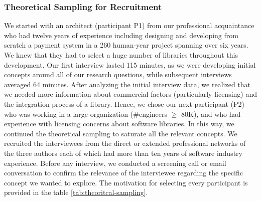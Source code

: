 \subsubsection{Theoretical Sampling for Recruitment}

We started with an architect (participant P1) from our professional acquaintance who had twelve years of experience including designing and developing from scratch a payment system in a 260 human-year project spanning over six years. We knew that they had to select a huge number of libraries throughout this development. Our first interview lasted  115 minutes, as we were developing initial concepts around all of our research questions, while subsequent interviews averaged 64 minutes. %
After analyzing the initial interview data, we realized that we needed more information about commercial factors (particularly licensing) and the integration process of a library. Hence, we chose our next participant (P2) who was working in a large organization (\#engineers $\geq$ 80K), and who had experience with licensing concerns about software libraries. In this way, we continued the theoretical sampling to saturate all the relevant concepts. We recruited the interviewees from the direct or extended professional networks of the three authors each of which had more than ten years of software industry experience. Before any interview, we conducted a screening call or email conversation to confirm the relevance of the interviewee regarding the specific concept we wanted to explore. The motivation for selecting every participant is provided in the table \ref{tab:theoritcal-sampling}. 


